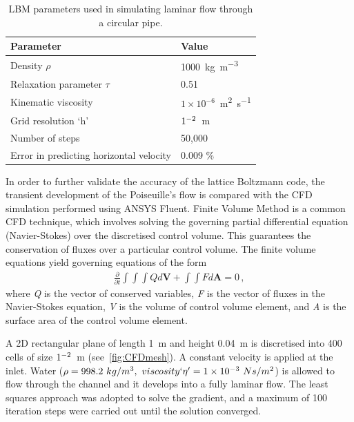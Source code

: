 \begin{table}[tb]
\caption{LBM parameters used in simulating laminar flow through 
a circular pipe.}
\label{table:lbm}
\centering
\begin{tabular}{ll}
\toprule
\textbf{Parameter} & \textbf{Value} \\ \midrule
Density $\rho$ & 1000~\si{\kilogram\per\metre\cubed}\\ 
Relaxation parameter $\tau$ & 0.51\\ 
Kinematic viscosity  & $1 \times 10^{-6}$~\si{\metre\squared\per\second} \\
Grid resolution `h' & $1 \time 10^{-2} $~\si{\meter} \\
Number of steps & 50,000 \\
\midrule
Error in predicting horizontal velocity & 0.009 \% \\ \bottomrule
\end{tabular}
\end{table}

In order to further validate the accuracy of the lattice Boltzmann code, the 
transient development of the Poiseuille's flow is compared with the CFD 
simulation performed using ANSYS Fluent. Finite Volume Method is a 
common CFD technique, which involves solving the governing partial differential 
equation (Navier-Stokes) over the discretised control volume. This guarantees 
the conservation of fluxes over a particular control volume. The finite volume 
equations yield governing equations of the form
%
\begin{align}
\frac{\partial}{\partial t} \int\int\int  Q d\mathbf{V} + 
\int\int \mathit{F} d\mathbf{A} = 0\,,
\end{align}
%
where \textit{Q} is the vector of conserved variables, \textit{F} is the vector 
of fluxes in the Navier-Stokes equation, \textit{V} is the volume of control 
volume element, and \textit{A} is the surface area of the control volume 
element.

A 2D rectangular plane of length 1~\si{\meter} and height 0.04~\si{\meter} 
is discretised into 400 cells of size $1 \time 10^{-2} $~\si{\meter} 
(see~\cref{fig:CFDmesh}). A constant velocity is applied at the 
inlet. Water ($\rho = 998.2\mbox{ }kg/m^{3},\mbox{ } 
viscosity`\eta'=1 \times 10^{-3}\mbox{ } Ns/m^{2} $) is allowed to flow through 
the channel and it develops into a fully laminar flow. The least squares 
approach was adopted to solve the gradient, and a maximum of 100 
iteration steps were carried out until the solution converged. 

